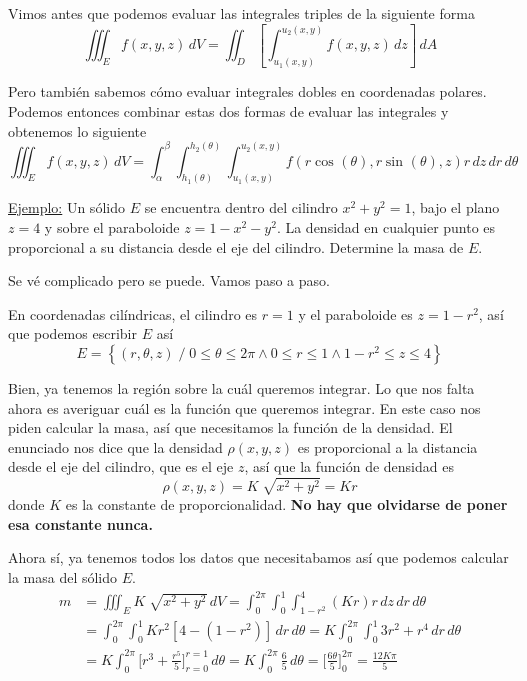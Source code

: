 \documentclass[12pt]{article}
\begin{document}
Vimos antes que podemos evaluar las integrales triples de la siguiente forma
\[
  \iiint_{E} f(x,y,z) \,dV=\iint_{D} \left[\int_{u_{1}(x,y)}^{u_{2}(x,y)} f(x,y,z) \,dz\right] \,dA
\]

Pero también sabemos cómo evaluar integrales dobles en coordenadas polares. Podemos entonces combinar estas dos formas de evaluar las integrales y obtenemos lo siguiente
\[
  \iiint_{E} f(x,y,z) \,dV=\int_{\alpha}^{\beta} \int_{h_{1}(\theta)}^{h_{2}(\theta)} \int_{u_{1}(x,y)}^{u_{2}(x,y)} f(r\cos^{}(\theta),r\sin^{}(\theta),z)r \,dz\,dr\,d\theta
\]

\underline{Ejemplo:} Un sólido $ E $ se encuentra dentro del cilindro $ x^2+y^2=1 $, bajo el plano $ z=4 $ y sobre el paraboloide $ z=1-x^2-y^2 $. La densidad en cualquier punto es proporcional a su distancia desde el eje del cilindro. Determine la masa de $ E $.

Se vé complicado pero se puede. Vamos paso a paso.

En coordenadas cilíndricas, el cilindro es $ r=1 $ y el paraboloide es $ z=1-r^2 $, así que podemos escribir $ E $ así
\[
E=\left\{(r,\theta,z) \;/\; 0\leq \theta\leq 2\pi \land 0\leq r\leq 1 \land 1-r^2\leq z\leq 4\right\}
\]

Bien, ya tenemos la región sobre la cuál queremos integrar. Lo que nos falta ahora es averiguar cuál es la función que queremos integrar. En este caso nos piden calcular la masa, así que necesitamos la función de la densidad. El enunciado nos dice que la densidad $ \rho(x,y,z) $ es proporcional a la distancia desde el eje del cilindro, que es el eje $ z $, así que la función de densidad es
\[
  \rho(x,y,z)=K\sqrt[]{x^2+y^2}=Kr
\]
donde $ K $ es la constante de proporcionalidad. \textbf{No hay que olvidarse de poner esa constante nunca.}

Ahora sí, ya tenemos todos los datos que necesitabamos así que podemos calcular la masa del sólido $ E $.
\begin{align*}
  m &= \iiint_{E} K\sqrt[]{x^2+y^2} \,dV=\int_{0}^{2\pi} \int_{0}^{1} \int_{1-r^2}^{4} (Kr)r \,dz\,dr\,d\theta\\
   &= \int_{0}^{2\pi} \int_{0}^{1} Kr^2\left[4-(1-r^2)\right] \,dr\,d\theta=K\int_{0}^{2\pi} \int_{0}^{1} 3r^2+r^4 \,dr\,d\theta\\
    &= K\int_{0}^{2\pi} \Bigg[r^3+\frac{r^5}{5}\Bigg]_{r=0}^{r=1} \,d\theta=K\int_{0}^{2\pi} \frac{6}{5} \,d\theta = \Bigg[\frac{6\theta}{5}\Bigg]_{0}^{2\pi}=\frac{12K\pi}{5}
\end{align*}
\end{document}
